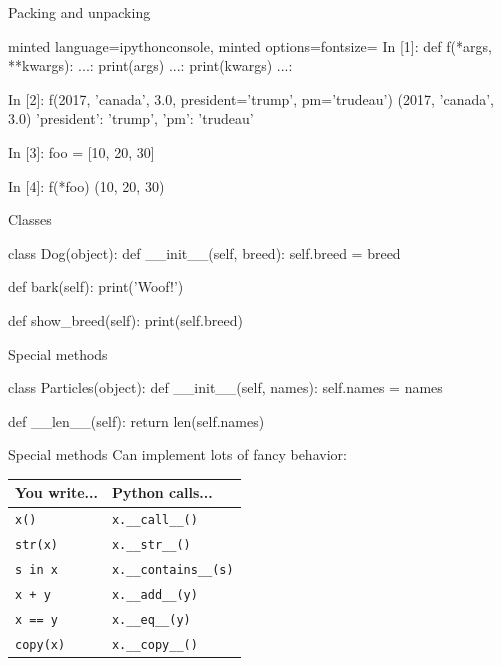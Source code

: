 \documentclass[noamssymb,svgnames]{beamer}
\begin{document}
\begin{frame}[fragile]{Packing and unpacking}
  \begin{tcblisting}{minted language=ipythonconsole,
      minted options={fontsize=\footnotesize}}
      In [1]: def f(*args, **kwargs):
         ...:     print(args)
         ...:     print(kwargs)
         ...:

      In [2]: f(2017, 'canada', 3.0, president='trump',
                pm='trudeau')
      (2017, 'canada', 3.0)
      {'president': 'trump', 'pm': 'trudeau'}

      In [3]: foo = [10, 20, 30]

      In [4]: f(*foo)
      (10, 20, 30)
      {}
  \end{tcblisting}
\end{frame}

\begin{frame}[fragile]{Classes}
  \begin{python}
      class Dog(object):
          def __init__(self, breed):
              self.breed = breed

          def bark(self):
              print('Woof!')

          def show_breed(self):
              print(self.breed)
  \end{python}
\end{frame}

\begin{frame}[fragile]{Special methods}
  \begin{python}
      class Particles(object):
          def __init__(self, names):
              self.names = names

          def __len__(self):
              return len(self.names)
  \end{python}
\end{frame}

\begin{frame}{Special methods}
  Can implement lots of fancy behavior:
  \begin{table}
    \centering
    \begin{tabular}{ll}
      \toprule
      You write... & Python calls... \\
      \midrule
      \texttt{x()} & \texttt{x.\_\_call\_\_()} \\
      \texttt{str(x)} & \texttt{x.\_\_str\_\_()} \\
      \texttt{s in x} & \texttt{x.\_\_contains\_\_(s)} \\
      \texttt{x + y} & \texttt{x.\_\_add\_\_(y)} \\
      \texttt{x == y} & \texttt{x.\_\_eq\_\_(y)} \\
      \texttt{copy(x)} & \texttt{x.\_\_copy\_\_()} \\
      \bottomrule
    \end{tabular}
  \end{table}
\end{frame}
\end{document}

